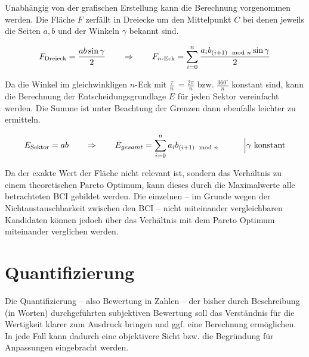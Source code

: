 Unabhängig von der grafischen Erstellung kann die Berechnung vorgenommen werden.
Die Fläche \(F\) zerfällt in Dreiecke um den Mittelpunkt \(C\) bei denen jeweils die Seiten \(a, b\) und der Winkeln \(\gamma\) bekannt sind.

\[
F_{\text{Dreieck}} = \frac{ab\sin{\gamma}}{2}
\text{\hspace{2em}}\Rightarrow{}\text{\hspace{2em}}
F_{n\text{-Eck}} = \sum_{i=0}^{n} \frac{a_{i} b_{(i+1)\mod n} \sin{\gamma}}{2}
\]

Da die Winkel im gleichwinkligen \(n\)-Eck mit %
\( \frac{\tau}{n}\ = \frac{2\pi}{n}\) bzw. \(\frac{360^\circ{}}{n}\) konstant sind,
kann die Berechnung der Entscheidungsgrundlage \(E\) für jeden Sektor vereinfacht werden.
Die Summe ist unter Beachtung der Grenzen dann ebenfalls leichter zu ermitteln.

\[
E_{\text{Sektor}} = ab 
\text{\hspace{2em}}\Rightarrow{}\text{\hspace{2em}}
E_{gesamt} = \sum_{i=0}^{n} a_{i} b_{(i+1)\mod n}\text{\hspace{3em}}\Big|{\gamma \text{ konstant}}
\]

Da der exakte Wert der Fläche nicht relevant ist, sondern das Verhältnis zu einem theoretischen Pareto Optimum,
kann dieses durch die Maximalwerte alle betrachteten \gls{BCI} gebildet werden.
Die einzelnen -- im Grunde wegen der Nichtaustauschbarkeit zwischen den \gls{BCI} -- nicht miteinander vergleichbaren
Kandidaten können jedoch über das Verhältnis mit dem Pareto Optimum miteinander verglichen werden.



\section{Quantifizierung}

Die Quantifizierung -- also Bewertung in Zahlen -- der bisher durch Beschreibung (in Worten) durchgeführten subjektiven Bewertung soll das Verständnis für die Wertigkeit klarer zum Ausdruck bringen und ggf. eine Berechnung ermöglichen.
In jede Fall kann dadurch eine objektivere Sicht bzw. die Begründung für Anpassungen eingebracht werden.


